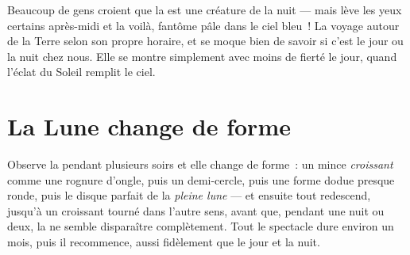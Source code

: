 \begin{remark}\label{rem:g2:moon-in-the-sky:daytime}
Beaucoup de gens croient que la  est une créature de la nuit ---
mais lève les yeux certains après-midi et la voilà, fantôme pâle dans
le ciel bleu~! La  voyage autour de la Terre selon son propre
horaire, et se moque bien de savoir si c'est le jour ou la nuit chez
nous. Elle se montre simplement avec moins de fierté le jour, quand
l'éclat du Soleil remplit le ciel.
\end{remark}

\section{La Lune change de forme}

\begin{example}\label{ex:g2:moon-in-the-sky:shapes}
Observe la  pendant plusieurs soirs et elle change de forme~: un
mince \emph{croissant} comme une rognure d'ongle,
puis un demi-cercle, puis une forme dodue presque ronde, puis le
disque parfait de la \emph{pleine lune} --- et
ensuite tout redescend, jusqu'à un croissant tourné dans l'autre
sens, avant que, pendant une nuit ou deux, la  ne semble
disparaître complètement. Tout le spectacle dure environ un mois,
puis il recommence, aussi fidèlement que le jour et la nuit.
\end{example}

